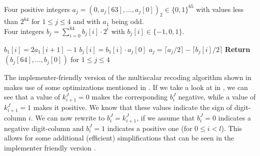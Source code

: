 \begin{algorithm}
	\algorithmicrequire Four positive integers $a_j = (0, a_j[63], \ldots, a_j[0])_2 \in \{0, 1\}^{65}$ with values less than $2^{64}$ for $1 \le j \le 4$ and with $a_1$ being odd. \\
	\algorithmicensure Four integers $b_j = \sum_{i=0}^{64} b_j[i] \cdot 2^i$ with $b_j [i] \in \{-1, 0, 1\}$.
	\begin{algorithmic}[1]
				\State $b_1[i] = 2 a_1 [i + 1] - 1$
			\EndIf			
				\State $b_j[i] = b_1[i] \cdot a_j[0]$
				\State $a_j = \lceil a_j / 2\rceil - \lceil b_j[i]/2\rceil$
			\EndFor
		\EndFor
		\State \textbf{Return} $(b_j[64], \ldots, b_j[0])$ for $1 \le j \le 4$
	\end{algorithmic}
	\label{algo: FourQ multiscalar recoding reader-friendly}
\end{algorithm}
%
The implementer-friendly version of the multiscalar recoding algorithm shown in \cite[Algorithm 1]{costello2015fourq} makes use of some optimizations mentioned in \cite{faz2015efficient}.
If we take a look at  in , we can see that a value of $k_{i + 1}^J = 0$ makes the corresponding $b_i^J$ negative, while a value of $k_{i + 1}^J = 1$ makes it positive.
We know that these values indicate the sign of digit-column $i$.
We can now rewrite  to $b_i^J = k_{i + 1}^J$, if we assume that $b_i^J = 0$ indicates a negative digit-column and $b_i^J = 1$ indicates a positive one (for $0 \le i < l$).
This allows for some additional (efficient) simplifications that can be seen in the implementer friendly version \cite[Algorithm 1]{costello2015fourq}.

